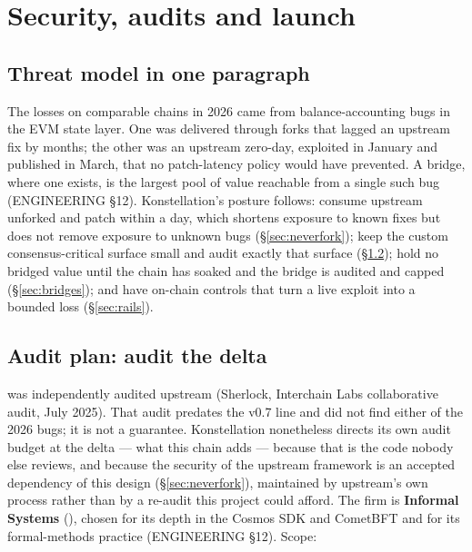 \section{Security, audits and launch}
\label{sec:security}

\subsection{Threat model in one paragraph}

The losses on comparable chains in 2026 came from balance-accounting bugs in
the EVM state layer. One was delivered through forks that lagged an upstream
fix by months; the other was an upstream zero-day, exploited in January and
published in March, that no patch-latency policy would have prevented. A
bridge, where one exists, is the largest pool of value reachable from a single
such bug (ENGINEERING \S12). Konstellation's posture follows: consume upstream
unforked and patch within a day, which shortens exposure to known fixes but
does not remove exposure to unknown bugs (\S\ref{sec:neverfork}); keep the custom consensus-critical surface small and
audit exactly that surface (\S\ref{sec:audit}); hold no bridged value until the
chain has soaked and the bridge is audited and capped (\S\ref{sec:bridges});
and have on-chain controls that turn a live exploit into a bounded loss
(\S\ref{sec:rails}).

\subsection{Audit plan: audit the delta}
\label{sec:audit}

 was independently audited upstream (Sherlock, Interchain
Labs collaborative audit, July 2025). That audit predates the v0.7 line and
did not find either of the 2026 bugs; it is not a guarantee. Konstellation
nonetheless directs its own audit budget at the delta --- what this chain
adds --- because that is the code nobody else reviews, and because the
security of the upstream framework is an accepted dependency of this design
(\S\ref{sec:neverfork}), maintained by upstream's own process rather than by
a re-audit this project could afford. The firm is \textbf{Informal Systems} (), chosen for its depth in
the Cosmos SDK and CometBFT and for its formal-methods practice (ENGINEERING
\S12). Scope:

